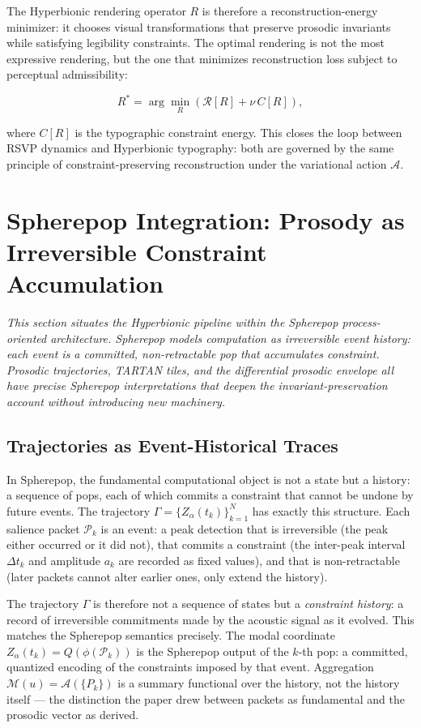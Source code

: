 \documentclass[12pt, a4paper]{article}
\begin{document}
The Hyperbionic rendering operator $R$ is therefore a reconstruction-energy minimizer: it chooses visual transformations that preserve prosodic invariants while satisfying legibility constraints. The optimal rendering is not the most expressive rendering, but the one that minimizes reconstruction loss subject to perceptual admissibility:

\begin{equation}
R^* = \arg\min_R \left(\mathcal{R}[R] + \nu\, C[R]\right),
\label{eq:OptR}
\end{equation}

where $C[R]$ is the typographic constraint energy. This closes the loop between RSVP dynamics and Hyperbionic typography: both are governed by the same principle of constraint-preserving reconstruction under the variational action $\mathcal{A}$.


\section{Spherepop Integration: Prosody as Irreversible Constraint Accumulation}

\noindent\textit{This section situates the Hyperbionic pipeline within the Spherepop process-oriented architecture. Spherepop models computation as irreversible event history: each event is a committed, non-retractable pop that accumulates constraint. Prosodic trajectories, TARTAN tiles, and the differential prosodic envelope all have precise Spherepop interpretations that deepen the invariant-preservation account without introducing new machinery.}

\subsection{Trajectories as Event-Historical Traces}

In Spherepop, the fundamental computational object is not a state but a history: a sequence of pops, each of which commits a constraint that cannot be undone by future events. The trajectory $\Gamma = \{Z_\alpha(t_k)\}_{k=1}^N$ has exactly this structure. Each salience packet $\mathcal{P}_k$ is an event: a peak detection that is irreversible (the peak either occurred or it did not), that commits a constraint (the inter-peak interval $\Delta t_k$ and amplitude $a_k$ are recorded as fixed values), and that is non-retractable (later packets cannot alter earlier ones, only extend the history).

The trajectory $\Gamma$ is therefore not a sequence of states but a \emph{constraint history}: a record of irreversible commitments made by the acoustic signal as it evolved. This matches the Spherepop semantics precisely. The modal coordinate $Z_\alpha(t_k) = Q(\phi(\mathcal{P}_k))$ is the Spherepop output of the $k$-th pop: a committed, quantized encoding of the constraints imposed by that event. Aggregation $\mathcal{M}(u) = \mathcal{A}(\{P_k\})$ is a summary functional over the history, not the history itself — the distinction the paper drew between packets as fundamental and the prosodic vector as derived.
\end{document}
